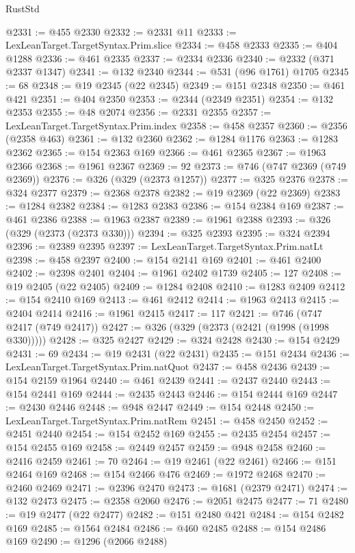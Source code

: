 \begin{lexlean}{RustStd}
\begin{coremodule}
@2331 := @455 @2330
@2332 := @2331 @11
@2333 := LexLeanTarget.TargetSyntax.Prim.slice
@2334 := @458 @2333
@2335 := @404 @1288
@2336 := @461 @2335
@2337 := @2334 @2336
@2340 := @2332 (@371 @2337 @1347)
@2341 := @132 @2340
@2344 := @531 (@96 @1761) @1705
@2345 := 68
@2348 := @19 @2345 (@22 @2345)
@2349 := @151 @2348
@2350 := @461 @421
@2351 := @404 @2350
@2353 := @2344 (@2349 @2351)
@2354 := @132 @2353
@2355 := @48 @2074
@2356 := @2331 @2355
@2357 := LexLeanTarget.TargetSyntax.Prim.index
@2358 := @458 @2357
@2360 := @2356 (@2358 @463)
@2361 := @132 @2360
@2362 := @1284 @1176
@2363 := @1283 @2362
@2365 := @154 @2363 @169
@2366 := @461 @2365
@2367 := @1963 @2366
@2368 := @1961 @2367
@2369 := 92
@2373 := @746 (@747 @2369 (@749 @2369))
@2376 := @326 (@329 (@2373 @1257))
@2377 := @325 @2376
@2378 := @324 @2377
@2379 := @2368 @2378
@2382 := @19 @2369 (@22 @2369)
@2383 := @1284 @2382
@2384 := @1283 @2383
@2386 := @154 @2384 @169
@2387 := @461 @2386
@2388 := @1963 @2387
@2389 := @1961 @2388
@2393 := @326 (@329 (@2373 (@2373 @330)))
@2394 := @325 @2393
@2395 := @324 @2394
@2396 := @2389 @2395
@2397 := LexLeanTarget.TargetSyntax.Prim.natLt
@2398 := @458 @2397
@2400 := @154 @2141 @169
@2401 := @461 @2400
@2402 := @2398 @2401
@2404 := @1961 @2402 @1739
@2405 := 127
@2408 := @19 @2405 (@22 @2405)
@2409 := @1284 @2408
@2410 := @1283 @2409
@2412 := @154 @2410 @169
@2413 := @461 @2412
@2414 := @1963 @2413
@2415 := @2404 @2414
@2416 := @1961 @2415
@2417 := 117
@2421 := @746 (@747 @2417 (@749 @2417))
@2427 := @326 (@329 (@2373 (@2421 (@1998 (@1998 @330)))))
@2428 := @325 @2427
@2429 := @324 @2428
@2430 := @154 @2429
@2431 := 69
@2434 := @19 @2431 (@22 @2431)
@2435 := @151 @2434
@2436 := LexLeanTarget.TargetSyntax.Prim.natQuot
@2437 := @458 @2436
@2439 := @154 @2159 @1964
@2440 := @461 @2439
@2441 := @2437 @2440
@2443 := @154 @2441 @169
@2444 := @2435 @2443
@2446 := @154 @2444 @169
@2447 := @2430 @2446
@2448 := @948 @2447
@2449 := @154 @2448
@2450 := LexLeanTarget.TargetSyntax.Prim.natRem
@2451 := @458 @2450
@2452 := @2451 @2440
@2454 := @154 @2452 @169
@2455 := @2435 @2454
@2457 := @154 @2455 @169
@2458 := @2449 @2457
@2459 := @948 @2458
@2460 := @2416 @2459
@2461 := 70
@2464 := @19 @2461 (@22 @2461)
@2466 := @151 @2464 @169
@2468 := @154 @2466 @476
@2469 := @1972 @2468
@2470 := @2460 @2469
@2471 := @2396 @2470
@2473 := @1681 (@2379 @2471)
@2474 := @132 @2473
@2475 := @2358 @2060
@2476 := @2051 @2475
@2477 := 71
@2480 := @19 @2477 (@22 @2477)
@2482 := @151 @2480 @421
@2484 := @154 @2482 @169
@2485 := @1564 @2484
@2486 := @460 @2485
@2488 := @154 @2486 @169
@2490 := @1296 (@2066 @2488)

\end{coremodule}
\end{lexlean}
